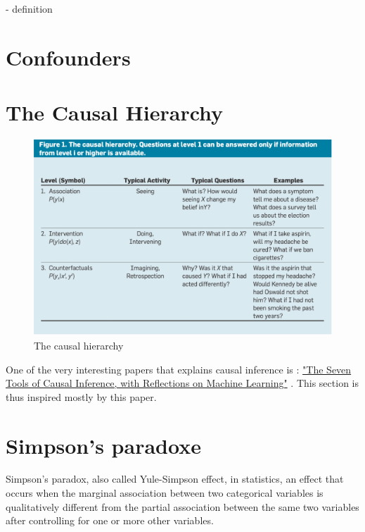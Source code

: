 \documentclass{article}
\begin{document}
- definition 


\section{Confounders}



\section{The Causal Hierarchy}


\begin{figure}[h]
\centering
\includegraphics[width=0.7 \textwidth]{figures/asso_inter_caus.png}
\caption{The causal hierarchy\cite{pearl2019seven}}
\end{figure}


One of the very interesting papers that explains causal inference is : \href{https://cacm.acm.org/magazines/2019/3/234929-the-seven-tools-of-causal-inference-with-reflections-on-machine-learning/fulltext?mobile=false}{"The Seven Tools of Causal Inference, with Reflections on Machine Learning"} \cite{pearl2019seven}. This section is thus inspired mostly by this paper.

 \cite{pearl2019seven} 
 
 
 \section{Simpson's paradoxe}

Simpson’s paradox, also called Yule-Simpson effect, in statistics, an effect that occurs when the marginal association between two categorical variables is qualitatively different from the partial association between the same two variables after controlling for one or more other variables.
\end{document}
